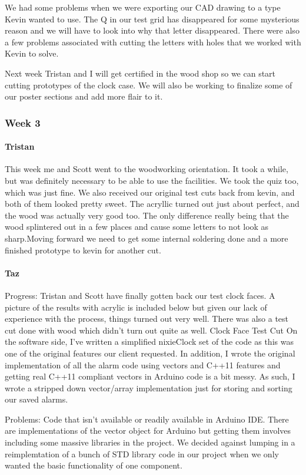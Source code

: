 \documentclass[onecolumn, draftclsnofoot,10pt, compsoc]{IEEEtran}
\begin{document}
We had some problems when we were exporting our CAD drawing to a type Kevin wanted to use. The Q in our test grid has disappeared for some mysterious reason and we will have to look into why that letter disappeared. There were also a few problems associated with cutting the letters with holes that we worked with Kevin to solve.

Next week Tristan and I will get certified in the wood shop so we can start cutting prototypes of the clock case. We will also be working to finalize some of our poster sections and add more flair to it.
\subsubsection{Week 3}
\paragraph{Tristan}
This week me and Scott went to the woodworking orientation. It took a while, but was definitely necessary to be able to use the facilities. We took the quiz too, which was just fine. We also received our original test cuts back from kevin, and both of them looked pretty sweet. The acryllic turned out just about perfect, and the wood was actually very good too. The only difference really being that the wood splintered out in a few places and cause some letters to not look as sharp.Moving forward we need to get some internal soldering done and a more finished prototype to kevin for another cut.

\paragraph{Taz}
Progress: Tristan and Scott have finally gotten back our test clock faces. A picture of the results with acrylic is included below but given our lack of experience with the process, things turned out very well. There was also a test cut done with wood which didn't turn out quite as well. Clock Face Test Cut On the software side, I've written a simplified nixieClock set of the code as this was one of the original features our client requested. In addition, I wrote the original implementation of all the alarm code using vectors and C++11 features and getting real C++11 compliant vectors in Arduino code is a bit messy. As such, I wrote a stripped down vector/array implementation just for storing and sorting our saved alarms.

Problems: Code that isn't available or readily available in Arduino IDE. There are implementations of the vector object for Arduino but getting them involves including some massive libraries in the project. We decided against lumping in a reimplemtation of a bunch of STD library code in our project when we only wanted the basic functionality of one component.
\end{document}
